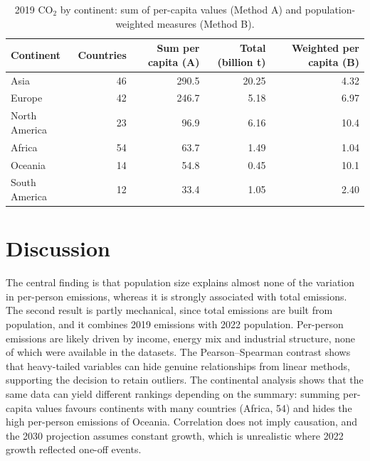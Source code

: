 \documentclass[11pt,a4paper]{article}
\begin{document}
	\begin{table}[ht]
		\centering
		\small
		\caption{2019 CO$_2$ by continent: sum of per-capita values (Method A) and population-weighted measures (Method B).}
		\label{tab:cont}
		\begin{tabular}{lrrrr}
			\toprule
			Continent & Countries & Sum per capita (A) & Total (billion t) & Weighted per capita (B) \\
			\midrule
			Asia          & 46 & 290.5 & 20.25 & 4.32 \\
			Europe        & 42 & 246.7 & 5.18  & 6.97 \\
			North America & 23 & 96.9  & 6.16  & 10.4 \\
			Africa        & 54 & 63.7  & 1.49  & 1.04 \\
			Oceania       & 14 & 54.8  & 0.45  & 10.1 \\
			South America & 12 & 33.4  & 1.05  & 2.40 \\
			\bottomrule
		\end{tabular}
	\end{table}
	
	\section{Discussion}
	The central finding is that population size explains almost none of the variation in per-person emissions, whereas it is strongly associated with total emissions. The second result is partly mechanical, since total emissions are built from population, and it combines 2019 emissions with 2022 population. Per-person emissions are likely driven by income, energy mix and industrial structure, none of which were available in the datasets. The Pearson--Spearman contrast shows that heavy-tailed variables can hide genuine relationships from linear methods, supporting the decision to retain outliers. The continental analysis shows that the same data can yield different rankings depending on the summary: summing per-capita values favours continents with many countries (Africa, 54) and hides the high per-person emissions of Oceania. Correlation does not imply causation, and the 2030 projection assumes constant growth, which is unrealistic where 2022 growth reflected one-off events.
	
\end{document}
